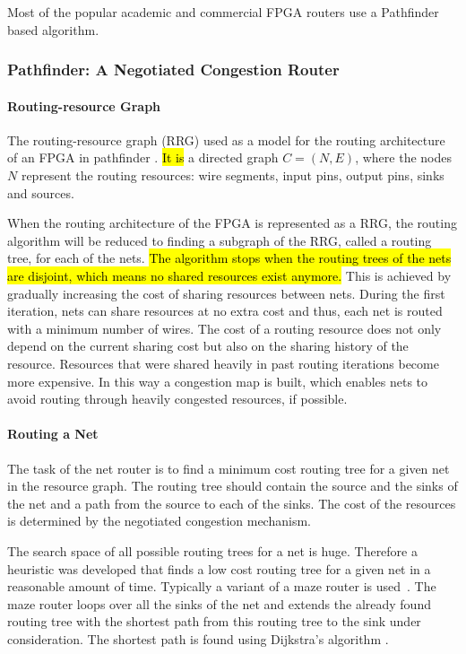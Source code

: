 \documentclass[a4paper,oneside,12pt]{article}
\begin{document}
Most of the popular academic and commercial FPGA routers use a Pathfinder based algorithm\cite{vprboek,betz1997vanppartffr}.

\subsubsection{{\sc Pathfinder}: A Negotiated Congestion Router}
\label{sec:pathfinder}
\paragraph{Routing-resource Graph}
The routing-resource graph (RRG) used as a model for the routing architecture of an FPGA in {\sc pathfinder} \cite{mcmurchie1995panprff}. \hl{It is} a directed graph $C=(N,E)$, where the nodes $N$ represent the routing resources: wire segments, input pins, output pins, sinks and sources.

When the routing architecture of the FPGA is represented as a RRG, the routing algorithm will be reduced to finding a subgraph of the RRG, called a routing tree, for each of the nets. \hl{The algorithm stops when the routing trees of the nets are disjoint, which means no shared resources exist anymore.}\cite{nair1987asyetfgw}
This is achieved by gradually increasing the cost of sharing resources between nets. During the first iteration, nets can share resources at no extra cost and thus, each net is routed with a minimum number of wires. The cost of a routing resource does not only depend on the current sharing cost but also on the sharing history of the resource. Resources that were shared heavily in past routing iterations become more expensive. In this way a congestion map is built, which enables nets to avoid routing through heavily congested resources, if possible.

\paragraph{Routing a Net}
The task of the net router is to find a minimum cost routing tree for a given net in the resource graph. The routing tree should contain the source and the sinks of the net and a path from the source to each of the sinks. The cost of the resources is determined by the negotiated congestion mechanism.

The search space of all possible routing trees for a net is huge. Therefore a heuristic was developed that finds a low cost routing tree for a given net in a reasonable amount of time. Typically a variant of a maze router is used~\cite{lee1961aafpcaia}. The maze router loops over all the sinks of the net and extends the already found routing tree with the shortest path from this routing tree to the sink under consideration. The shortest path is found using Dijkstra's algorithm \cite{dijkstra1959anotpicwg}.
\end{document}
